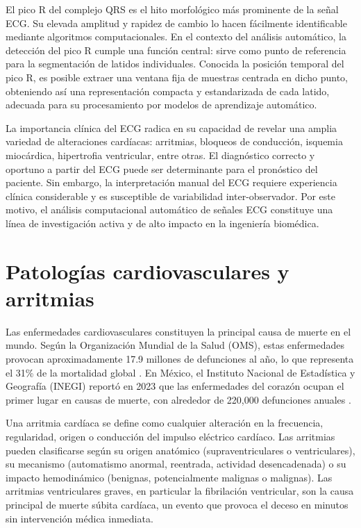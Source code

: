 El pico R del complejo QRS es el hito morfológico más prominente de la señal ECG. Su elevada amplitud y rapidez de cambio lo hacen fácilmente identificable mediante algoritmos computacionales. En el contexto del análisis automático, la detección del pico R cumple una función central: sirve como punto de referencia para la segmentación de latidos individuales. Conocida la posición temporal del pico R, es posible extraer una ventana fija de muestras centrada en dicho punto, obteniendo así una representación compacta y estandarizada de cada latido, adecuada para su procesamiento por modelos de aprendizaje automático.

La importancia clínica del ECG radica en su capacidad de revelar una amplia variedad de alteraciones cardíacas: arritmias, bloqueos de conducción, isquemia miocárdica, hipertrofia ventricular, entre otras. El diagnóstico correcto y oportuno a partir del ECG puede ser determinante para el pronóstico del paciente. Sin embargo, la interpretación manual del ECG requiere experiencia clínica considerable y es susceptible de variabilidad inter-observador. Por este motivo, el análisis computacional automático de señales ECG constituye una línea de investigación activa y de alto impacto en la ingeniería biomédica.

\section{Patologías cardiovasculares y arritmias}

Las enfermedades cardiovasculares constituyen la principal causa de muerte en el mundo. Según la Organización Mundial de la Salud (OMS), estas enfermedades provocan aproximadamente 17.9 millones de defunciones al año, lo que representa el 31\% de la mortalidad global \cite{WHO2024}. En México, el Instituto Nacional de Estadística y Geografía (INEGI) reportó en 2023 que las enfermedades del corazón ocupan el primer lugar en causas de muerte, con alrededor de 220,000 defunciones anuales \cite{INEGI2024}.

Una arritmia cardíaca se define como cualquier alteración en la frecuencia, regularidad, origen o conducción del impulso eléctrico cardíaco. Las arritmias pueden clasificarse según su origen anatómico (supraventriculares o ventriculares), su mecanismo (automatismo anormal, reentrada, actividad desencadenada) o su impacto hemodinámico (benignas, potencialmente malignas o malignas). Las arritmias ventriculares graves, en particular la fibrilación ventricular, son la causa principal de muerte súbita cardíaca, un evento que provoca el deceso en minutos sin intervención médica inmediata.

